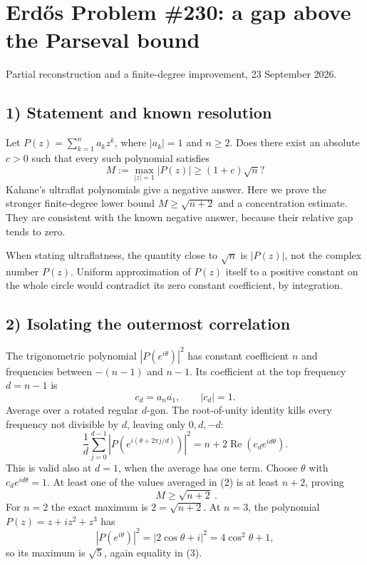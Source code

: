 \section{Erd\H{o}s Problem \#230: a gap above the Parseval bound}
\noindent Partial reconstruction and a finite-degree improvement, 23 September 2026.

\subsection*{1) Statement and known resolution}
Let $P(z)=\sum_{k=1}^n a_kz^k$, where $|a_k|=1$ and $n\ge2$. Does there exist an absolute $c>0$ such that every such polynomial satisfies
\[
 M:=\max_{|z|=1}|P(z)|\ge(1+c)\sqrt n?\tag{1}
\]
Kahane's ultraflat polynomials give a negative answer. Here we prove the stronger finite-degree lower bound $M\ge\sqrt{n+2}$ and a concentration estimate. They are consistent with the known negative answer, because their relative gap tends to zero.

When stating ultraflatness, the quantity close to $\sqrt n$ is $|P(z)|$, not the complex number $P(z)$. Uniform approximation of $P(z)$ itself to a positive constant on the whole circle would contradict its zero constant coefficient, by integration.

\subsection*{2) Isolating the outermost correlation}
The trigonometric polynomial $|P(e^{i\theta})|^2$ has constant coefficient $n$ and frequencies between $-(n-1)$ and $n-1$. Its coefficient at the top frequency $d=n-1$ is
\[
 c_d=a_n\overline{a_1},\qquad |c_d|=1.
\]
Average over a rotated regular $d$-gon. The root-of-unity identity kills every frequency not divisible by $d$, leaving only $0,d,-d$:
\[
 \frac1d\sum_{j=0}^{d-1}
 \left|P\left(e^{i(\theta+2\pi j/d)}\right)\right|^2
 =n+2\operatorname{Re}(c_de^{id\theta}).\tag{2}
\]
This is valid also at $d=1$, when the average has one term. Choose $\theta$ with $c_de^{id\theta}=1$. At least one of the values averaged in (2) is at least $n+2$, proving
\[
 \boxed{\ M\ge\sqrt{n+2}\ }.\tag{3}
\]
For $n=2$ the exact maximum is $2=\sqrt{n+2}$. At $n=3$, the polynomial $P(z)=z+iz^2+z^3$ has
\[
 |P(e^{i\theta})|^2=|2\cos\theta+i|^2=4\cos^2\theta+1,
\]
so its maximum is $\sqrt5$, again equality in (3).

